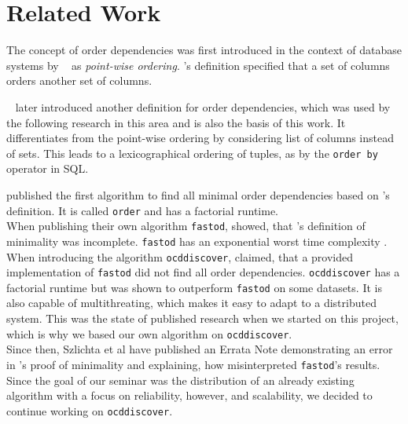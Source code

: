 
\section{Related Work}\label{sec:related_work}
  The concept of order dependencies was first introduced in the context of database systems by \citeauthor{ginsburg}~\cite{ginsburg} as \textit{point-wise ordering}.
  \citeauthor{ginsburg}'s definition specified that a set of columns orders another set of columns.

  \citeauthor{szlichta:fundamentals}~\cite{szlichta:fundamentals} later introduced another definition for order dependencies, which was used by the following research in this area \cite{consonni, langer, szlichta:discovery} and is also the basis of this work.
  It differentiates from the point-wise ordering by considering list of columns instead of sets.
  This leads to a lexicographical ordering of tuples, as by the \texttt{order by} operator in SQL.

\citeauthor{langer} published the first algorithm to find all minimal order dependencies based on \citeauthor{szlichta:fundamentals}'s definition. 
It is called \texttt{order} and has a factorial runtime.\\
When publishing their own algorithm \texttt{fastod}, \citeauthor{szlichta:discovery} showed, that \citeauthor{langer}'s definition of minimality was incomplete. 
\texttt{fastod} has an exponential worst time complexity \citep{szlichta:discovery}.\\
When introducing the algorithm \texttt{ocddiscover}, \citeauthor{consonni} claimed, that a provided implementation of \texttt{fastod} did not find all order dependencies. 
\texttt{ocddiscover} has a factorial runtime but was shown to outperform \texttt{fastod} on some datasets. 
It is also capable of multithreating, which makes it easy to adapt to a distributed system.
This was the state of published research when we started on this project, which is why we based our own algorithm on \texttt{ocddiscover}. \\
Since then, Szlichta et al have published an Errata Note demonstrating an error in \citeauthor{consonni}'s proof of minimality and explaining, how \citeauthor{consonni} misinterpreted \texttt{fastod}'s results.
Since the goal of our seminar was the distribution of an already existing algorithm with a focus on reliability, however, and scalability, we decided to continue working on \texttt{ocddiscover}.
